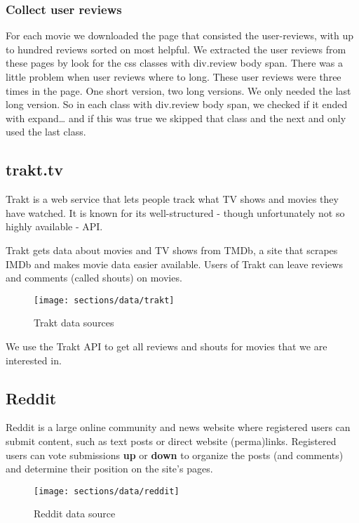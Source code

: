 \subsubsection{Collect user reviews}
For each movie we downloaded the page that consisted the user-reviews, with up to hundred reviews sorted on most helpful. 
We extracted the user reviews from these pages by look for the css classes with div.review body span. 
There was a little problem when user reviews where to long. These user reviews were three times in the page. One short version, two long versions. 
We only needed the last long version. So in each class with  div.review body span, 
we checked if it ended with expand… and if this was true we skipped that class and the next and only used the last class. 

\subsection{trakt.tv}
\label{sec:data:trakt}
Trakt is a web service that lets people track what TV shows and movies they have watched.
It is known for its well-structured - though unfortunately not so highly available - API.

Trakt gets data about movies and TV shows from TMDb, a site that scrapes IMDb and makes movie data easier available.
Users of Trakt can leave reviews and comments (called shouts) on movies.

\begin{figure}[H]
	\centering
	\texttt{[image: sections/data/trakt]}
	\caption{Trakt data sources}
\end{figure}

We use the Trakt API to get all reviews and shouts for movies that we are interested in.

\subsection{Reddit}
\label{sec:data:reddit}
Reddit is a large online community and news website where registered users can submit content, such as text posts or direct website (perma)links. 
Registered users can vote submissions \textbf{up} or \textbf{down} to organize the posts (and comments) and determine their position on the site's pages. 

\begin{figure}[H]
	\centering
	\texttt{[image: sections/data/reddit]}
	\caption{Reddit data source}
\end{figure}

